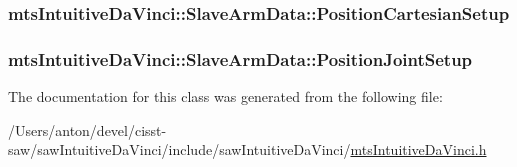 \subsubsection[{Position\+Cartesian\+Setup}]{ mts\+Intuitive\+Da\+Vinci\+::\+Slave\+Arm\+Data\+::\+Position\+Cartesian\+Setup}\label{classmts_intuitive_da_vinci_1_1_slave_arm_data_a09a328a245e9ccf2d482941fba0c76bc}
\hypertarget{classmts_intuitive_da_vinci_1_1_slave_arm_data_a9510d583a4decfbd25c027bf7c1e3e15}{}
\subsubsection[{Position\+Joint\+Setup}]{ mts\+Intuitive\+Da\+Vinci\+::\+Slave\+Arm\+Data\+::\+Position\+Joint\+Setup}\label{classmts_intuitive_da_vinci_1_1_slave_arm_data_a9510d583a4decfbd25c027bf7c1e3e15}


The documentation for this class was generated from the following file\+:\begin{DoxyCompactItemize}
\item 
/\+Users/anton/devel/cisst-\/saw/saw\+Intuitive\+Da\+Vinci/include/saw\+Intuitive\+Da\+Vinci/\hyperlink{mts_intuitive_da_vinci_8h}{mts\+Intuitive\+Da\+Vinci.\+h}\end{DoxyCompactItemize}
